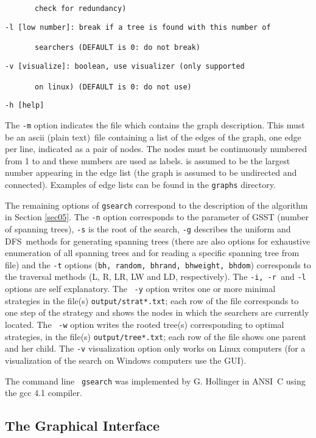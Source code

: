 \documentclass[11pt]{article}\usepackage{amsmath}
\begin{document}
\ \ \ \ \ \ \ \texttt{check for redundancy)}

\texttt{-l [low number]: break if a tree is found with this number of }

\ \ \ \ \ \ \ \texttt{searchers (DEFAULT is 0: do not break)}

\texttt{-v [visualize]: boolean, use visualizer (only supported }

\ \ \ \ \ \ \ \texttt{on linux) (DEFAULT is 0: do not use)}

\texttt{-h [help] }

\bigskip

The \texttt{-m} option indicates the file which contains the graph
description. This must be an ascii (plain text)\ file containing a list of the
edges of the graph, one edge per line, indicated as a pair of nodes. The nodes
must be continuously numbered from 1 to  and these numbers are used as
labels.  is assumed to be the largest number appearing in the edge list
(the graph is assumed to be undirected and connected). Examples of edge lists
can be found in the \texttt{graphs} directory.

The remaining options of \texttt{gsearch} correspond to the description of the
algorithm in Section \ref{sec05}. The \texttt{-n} option corresponds to the
 parameter of GSST (number of spanning trees), \texttt{-s} is the root of
the search, \texttt{-g} describes the uniform and DFS\ methods for generating
spanning trees (there are also options for exhaustive enumeration of all
spanning trees and for reading a specific spanning tree from file) and the
\texttt{-t} options (\texttt{bh, random, bhrand, bhweight, bhdom}) corresponds
to the traversal methods (L, R, LR, LW and LD, respectively). The \texttt{-i,
-r }and \texttt{-l} options are self explanatory. The \ \texttt{-y} option
writes one or more minimal strategies in the file(s)
\texttt{output/strat*.txt}; each row of the file corresponds to one step of
the strategy and shows the nodes in which the searchers are currently located.
The \ \texttt{-w} option writes the rooted tree(s) corresponding to optimal
strategies, in the file(s) \texttt{output/tree*.txt}; each row of the file
shows one parent and her child. The \texttt{-v} visualization option only
works on Linux computers (for a visualization of the search on Windows
computers use the GUI).

The command line \ \texttt{gsearch} was implemented by G. Hollinger in ANSI\ C
using the gcc 4.1 compiler.

\subsection{The Graphical I\textbf{nterface}}
\end{document}
